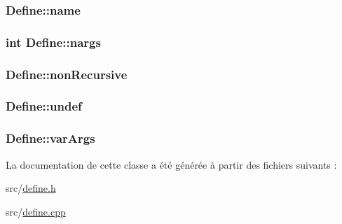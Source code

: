 \subsubsection[{name}]{ Define\+::name}\label{class_define_a2ab61e312bcf057292789daa0de8bf78}
\hypertarget{class_define_ad3306a44c59125a65fbf9559abe97930}{}
\subsubsection[{nargs}]{\setlength{\rightskip}{0pt plus 5cm}int Define\+::nargs}\label{class_define_ad3306a44c59125a65fbf9559abe97930}
\hypertarget{class_define_a673dcd69701965f0f62c73ce14dc6665}{}
\subsubsection[{non\+Recursive}]{ Define\+::non\+Recursive}\label{class_define_a673dcd69701965f0f62c73ce14dc6665}
\hypertarget{class_define_afde97e0a7fadda62d088b18acc7a5a0e}{}
\subsubsection[{undef}]{ Define\+::undef}\label{class_define_afde97e0a7fadda62d088b18acc7a5a0e}
\hypertarget{class_define_a1802523098fdd274fd15cd0494ad26d1}{}
\subsubsection[{var\+Args}]{ Define\+::var\+Args}\label{class_define_a1802523098fdd274fd15cd0494ad26d1}


La documentation de cette classe a été générée à partir des fichiers suivants \+:\begin{DoxyCompactItemize}
\item 
src/\hyperlink{src_2define_8h}{define.\+h}\item 
src/\hyperlink{define_8cpp}{define.\+cpp}\end{DoxyCompactItemize}
